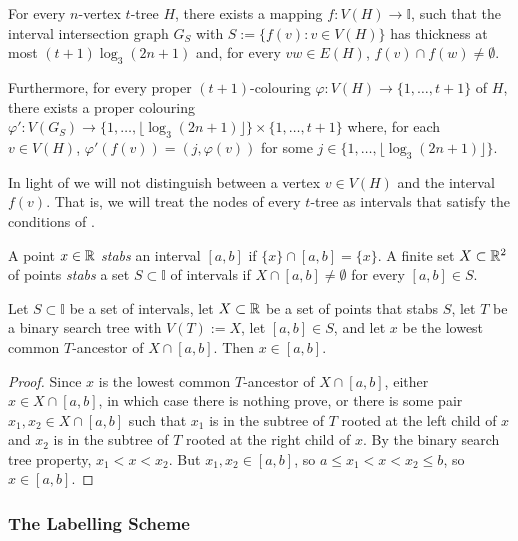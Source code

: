 \documentclass[kpfonts]{patmorin}
\let\le\leqslant
\begin{document}
\begin{lem}
  For every $n$-vertex $t$-tree $H$, there exists a mapping $f:V(H)\to\mathbb{I}$, such that the interval intersection graph $G_S$ with $S:=\{f(v):v\in V(H)\}$ has thickness at most $(t+1)\log_3(2n+1)$ and, for every $vw\in E(H)$, $f(v)\cap f(w)\neq\emptyset$.  
  
  Furthermore, for every proper $(t+1)$-colouring $\varphi:V(H)\to\{1,\ldots,t+1\}$ of $H$, there exists a proper colouring $\varphi':V(G_S)\to\{1,\ldots,\lfloor\log_3(2n+1)\rfloor\}\times\{1,\ldots,t+1\}$ where, for each $v\in V(H)$, $\varphi'(f(v))=(j,\varphi(v))$ for some $j\in\{1,\ldots,\lfloor\log_3(2n+1)\rfloor\}$.
\end{lem}

In light of  we will not distinguish between a vertex $v\in V(H)$ and the interval $f(v)$.  That is, we will treat the nodes of every $t$-tree as intervals that satisfy the conditions of .

A point $x\in\mathbb{R}$ \emph{stabs} an interval $[a,b]$ if $\{x\}\cap [a,b]=\{x\}$. A finite set $X\subset\mathbb{R}^2$ of points \emph{stabs} a set $S\subset\mathbb{I}$ of intervals if $X\cap [a,b]\neq\emptyset$ for every $[a,b]\in S$.

\begin{lem}
  Let $S\subset\mathbb{I}$ be a set of intervals, let $X\subset\mathbb{R}$ be a set of points that stabs $S$, let $T$ be a binary search tree with $V(T):=X$, let $[a,b]\in S$, and let $x$ be the lowest common $T$-ancestor of $X\cap [a,b]$.  Then $x\in [a,b]$.
\end{lem}

\begin{proof}
  Since $x$ is the lowest common $T$-ancestor of $X\cap[a,b]$, either $x\in X\cap[a,b]$, in which case there is nothing prove, or there is some pair $x_1,x_2\in X\cap[a,b]$ such that $x_1$ is in the subtree of $T$ rooted at the left child of $x$ and $x_2$ is in the subtree of $T$ rooted at the right child of $x$.  By the binary search tree property, $x_1<x<x_2$. But $x_1,x_2 \in [a,b]$, so $a\le x_1<x<x_2\le b$, so $x\in [a,b]$.  
\end{proof}

\subsubsection{The Labelling Scheme}
\end{document}
